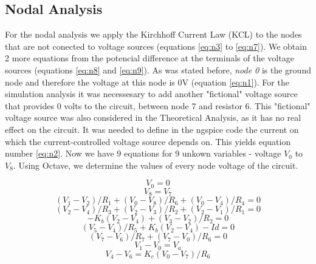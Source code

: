 \subsection{Nodal Analysis} 
For the nodal analysis we apply the Kirchhoff Current Law (KCL) to the nodes that are not conected to voltage sources (equations \ref{eq:n3} to \ref{eq:n7}). We obtain 2 more equations from the potencial difference at the terminals of the voltage sources (equations \ref{eq:n8} and \ref{eq:n9}). As was stated before, {\it node 0} is the ground node and therefore the voltage at this node is 0V (equation \ref{eq:n1}). For the simulation analysis it was necessesary to add another "fictional" voltage source that provides 0 volts to the circuit, between node 7 and resistor 6. This "fictional" voltage source was also considered in the Theoretical Analysis, as it has no real effect on the circuit. It was needed to define in the ngspice code the current on which the current-controlled voltage source depends on. This yields equation number \ref{eq:n2}. Now we have 9 equations for 9 unkown variables - voltage {\it$V_{0}$}  to {\it$V_{8}$}. Using Octave, we determine the values of every node voltage of the circuit. \par


\begin {equation}
	V_0 = 0
	\label{eq:n1}
\end{equation}
\begin {equation}
	V_8 = V_7
	\label{eq:n2}
\end{equation}
\begin {equation}
	(V_1-V_2)/R_1 +(V_0 - V_8)/R_6 + (V_0 - V_4)/R_4 = 0
	\label{eq:n3}
\end{equation}
\begin {equation}
	(V_2-V_4)/R_3 + (V_2-V_3)/R_2 + (V_2-V_1)/R_1 = 0
	\label{eq:n4}
\end{equation}
\begin {equation}
	- K_b(V_2-V_4) + (V_3-V_2)/R_2 = 0
	\label{eq:n5}
\end{equation}
\begin {equation}
	(V_5-V_4)/R_5 + K_b(V_2-V_4) - Id = 0
	\label{eq:n6}
\end{equation}
\begin {equation}
	(V_7-V_6)/R_7 + (V_7 - V_0)/R_6 = 0
	\label{eq:n7}
\end{equation}
\begin {equation}
	V_1 - V_0 = V_a
	\label{eq:n8}
\end{equation}
\begin {equation}
	V_4 - V_6 = K_c  (V_0 - V_7)/R_6
	\label{eq:n9}
\end{equation}




